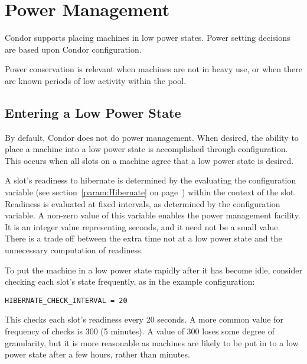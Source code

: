\section{\label{sec:power-man}Power Management}

Condor supports placing machines in low power states.
Power setting decisions are based upon  
Condor configuration.

Power conservation is relevant when machines are not in heavy use,
or when there are known periods of low activity within the pool.

\subsection{Entering a Low Power State}

By default, Condor does not do power management.
When desired, the ability to place a machine into a low
power state is accomplished through configuration.
This occurs when all slots on a machine agree that a low power state
is desired.

A slot's readiness to hibernate is determined by the 
evaluating the  configuration variable
(see section~\ref{param:Hibernate} on page~\pageref{param:Hibernate})
within the context of the slot.
Readiness is evaluated at fixed intervals, 
as determined by the  configuration variable.
A non-zero value of this variable enables the power management facility.
It is an integer value representing seconds,
and it need not be a small value.
There is a trade off between the extra time not at a low power state
and the unnecessary computation of readiness.  

To put the machine in a low power state rapidly
after it has become idle, consider checking each slot's state frequently,
as in the example configuration:

\begin{verbatim}
HIBERNATE_CHECK_INTERVAL = 20
\end{verbatim}

This checks each slot's readiness every 20 seconds.
A more common value for frequency of checks is 300 (5 minutes).
A value of 300 loses some degree of granularity,
but it is more reasonable as machines are likely to be put 
in to a low power state after a few hours, rather than minutes.
 
